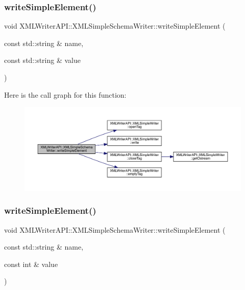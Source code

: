 \subsubsection{\texorpdfstring{writeSimpleElement()}{writeSimpleElement()}\hspace{0.1cm}{\footnotesize\ttfamily [2/20]}}
{\footnotesize\ttfamily void X\+M\+L\+Writer\+A\+P\+I\+::\+X\+M\+L\+Simple\+Schema\+Writer\+::write\+Simple\+Element (\begin{DoxyParamCaption}\item[{const std\+::string \&}]{name,  }\item[{const std\+::string \&}]{value }\end{DoxyParamCaption})\hspace{0.3cm}{\ttfamily [inline]}}

Here is the call graph for this function\+:
\nopagebreak
\begin{figure}[H]
\begin{center}
\leavevmode
\includegraphics[width=350pt]{db/d0b/classXMLWriterAPI_1_1XMLSimpleSchemaWriter_a312669330ac26b8849f671ea23ea60de_cgraph}
\end{center}
\end{figure}
\mbox{\label{classXMLWriterAPI_1_1XMLSimpleSchemaWriter_a40db83e5cfb496535b89dae68eeea314}} 
\subsubsection{\texorpdfstring{writeSimpleElement()}{writeSimpleElement()}\hspace{0.1cm}{\footnotesize\ttfamily [3/20]}}
{\footnotesize\ttfamily void X\+M\+L\+Writer\+A\+P\+I\+::\+X\+M\+L\+Simple\+Schema\+Writer\+::write\+Simple\+Element (\begin{DoxyParamCaption}\item[{const std\+::string \&}]{name,  }\item[{const int \&}]{value }\end{DoxyParamCaption})\hspace{0.3cm}{\ttfamily [inline]}}

